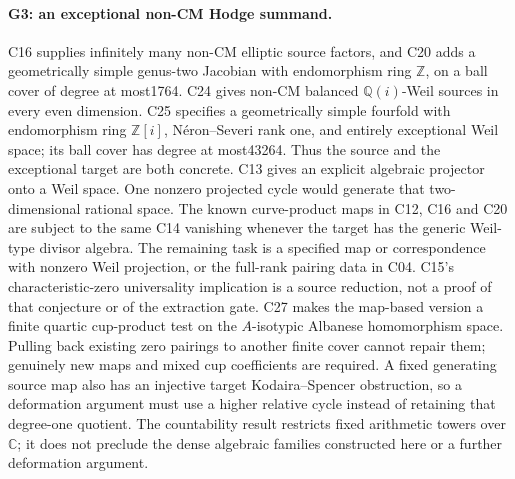 \documentclass[11pt]{article}
\newcommand{\Q}{\mathbb Q}\newcommand{\C}{\mathbb C}\newcommand{\Z}{\mathbb Z}\newcommand{\R}{\mathbb R}\newcommand{\A}{\mathbb A}\newcommand{\OO}{\mathcal O}
\theoremstyle{definition}\newtheorem{definition}[theorem]{Definition}\newtheorem{remark}[theorem]{Remark}
\begin{document}
\paragraph{G3: an exceptional non-CM Hodge summand.}
C16 supplies infinitely many non-CM elliptic source factors, and
C20 adds a geometrically simple genus-two Jacobian with
endomorphism ring $\Z$, on a ball cover of degree at most1764.
C24 gives non-CM balanced $\Q(i)$-Weil sources in every
even dimension. C25 specifies a geometrically simple fourfold
with endomorphism ring $\Z[i]$, N\'eron--Severi rank one,
and entirely exceptional Weil space; its ball cover has degree
at most43264. Thus the source and the exceptional target
are both concrete.
C13 gives
an explicit algebraic projector onto a Weil space. One nonzero
projected cycle would generate that two-dimensional rational space.
The known curve-product maps in C12, C16 and C20 are subject to the
same C14 vanishing whenever the target has the generic Weil-type
divisor algebra. The remaining task is a specified map or correspondence
with nonzero Weil projection, or the full-rank pairing data in C04.
C15's characteristic-zero universality implication is a source
reduction, not a proof of that conjecture or of the extraction gate.
C27 makes the map-based version a finite quartic cup-product
test on the $A$-isotypic Albanese homomorphism space. Pulling
back existing zero pairings to another finite cover cannot
repair them; genuinely new maps and mixed cup coefficients
are required. A fixed generating source map also has an
injective target Kodaira--Spencer obstruction, so a deformation
argument must use a higher relative cycle instead of retaining
that degree-one quotient.
The countability result restricts fixed arithmetic towers over
$\C$; it does not preclude the dense algebraic families constructed
here or a further deformation argument.
\end{document}
